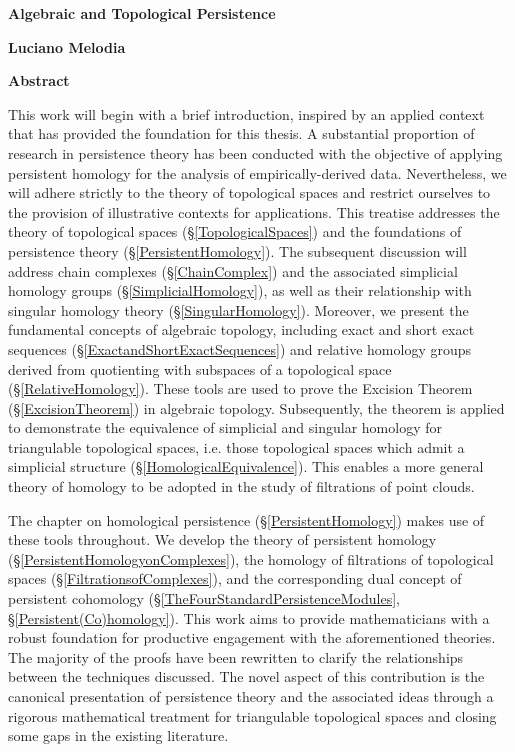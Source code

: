 \begin{center}
    \Large
    \textbf{Algebraic and Topological Persistence}
        
    \vspace{0.4cm}
    \large
    \textbf{Luciano Melodia}
    
    \vspace{0.9cm}
    \textbf{Abstract}
\end{center}

This work will begin with a brief introduction, inspired by an applied context that has provided the foundation for this thesis.  A substantial proportion of research in persistence theory has been conducted with the objective of applying persistent homology for the analysis of empirically-derived data. Nevertheless, we will adhere strictly to the theory of topological spaces and restrict ourselves to the provision of illustrative contexts for applications. This treatise addresses the theory of topological spaces (\S \ref{TopologicalSpaces}) and the foundations of persistence theory (\S \ref{PersistentHomology}). The subsequent discussion will address chain complexes (\S \ref{ChainComplex}) and the associated simplicial homology groups (\S \ref{SimplicialHomology}), as well as their relationship with singular homology theory (\S \ref{SingularHomology}). Moreover, we present the fundamental concepts of algebraic topology, including exact and short exact sequences (\S \ref{ExactandShortExactSequences}) and relative homology groups derived from quotienting with subspaces of a topological space (\S \ref{RelativeHomology}). These tools are used to prove the Excision Theorem (\S \ref{ExcisionTheorem}) in algebraic topology. Subsequently, the theorem is applied to demonstrate the equivalence of simplicial and singular homology for triangulable topological spaces, i.e. those topological spaces which admit a simplicial structure (\S \ref{HomologicalEquivalence}). This enables a more general theory of homology to be adopted in the study of filtrations of point clouds.

The chapter on homological persistence (\S \ref{PersistentHomology}) makes use of these tools throughout. We develop the theory of persistent homology (\S \ref{PersistentHomologyonComplexes}), the homology of filtrations of topological spaces (\S \ref{FiltrationsofComplexes}), and the corresponding dual concept of persistent cohomology (\S \ref{TheFourStandardPersistenceModules}, \S \ref{Persistent(Co)homology}). This work aims to provide mathematicians with a robust foundation for productive engagement with the aforementioned theories. The majority of the proofs have been rewritten to clarify the relationships between the techniques discussed. The novel aspect of this contribution is the canonical presentation of persistence theory and the associated ideas through a rigorous mathematical treatment for triangulable topological spaces and closing some gaps in the existing literature.